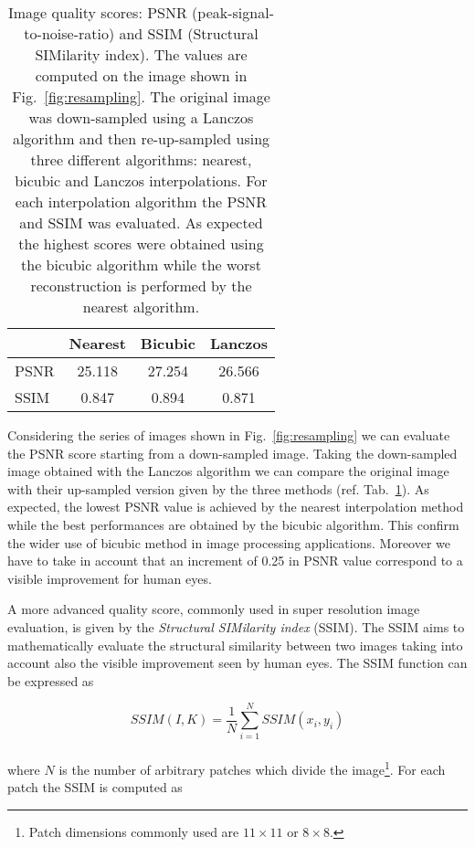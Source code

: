 \documentclass{standalone}
\begin{document}
\begin{table}[htbp]
\centering
\begin{tabular}{lccc}
\hline \rowcolor{darkgrayrow}
         & Nearest       & Bicubic        & Lanczos  \\
\hline
PSNR     & 25.118        & 27.254         & 26.566   \\
SSIM     &  0.847        &  0.894         &  0.871   \\
\hline
\end{tabular}
\caption{Image quality scores: PSNR (peak-signal-to-noise-ratio) and SSIM (Structural SIMilarity index).
The values are computed on the image shown in Fig.~\ref{fig:resampling}.
The original image was down-sampled using a Lanczos algorithm and then re-up-sampled using three different algorithms: nearest, bicubic and Lanczos interpolations.
For each interpolation algorithm the PSNR and SSIM was evaluated.
As expected the highest scores were obtained using the bicubic algorithm while the worst reconstruction is performed by the nearest algorithm.
}
\label{tab:psnr}
\end{table}

Considering the series of images shown in Fig.~\ref{fig:resampling} we can evaluate the PSNR score starting from a down-sampled image.
Taking the down-sampled image obtained with the Lanczos algorithm we can compare the original image with their up-sampled version given by the three methods (ref. Tab.~\ref{tab:psnr}).
As expected, the lowest PSNR value is achieved by the nearest interpolation method while the best performances are obtained by the bicubic algorithm.
This confirm the wider use of bicubic method in image processing applications.
Moreover we have to take in account that an increment of 0.25 in PSNR value correspond to a visible improvement for human eyes.

A more advanced quality score, commonly used in super resolution image evaluation, is given by the \emph{Structural SIMilarity index} (SSIM).
The SSIM aims to mathematically evaluate the structural similarity between two images taking into account also the visible improvement seen by human eyes.
The SSIM function can be expressed as

$$
SSIM(I, K) = \frac{1}{N}\sum_{i=1}^{N} SSIM(x_{i}, y_{i})
$$
\\
where $N$ is the number of arbitrary patches which divide the image\footnote{
  Patch dimensions commonly used are $11\times11$ or $8\times8$.
}.
For each patch the SSIM is computed as
\end{document}
